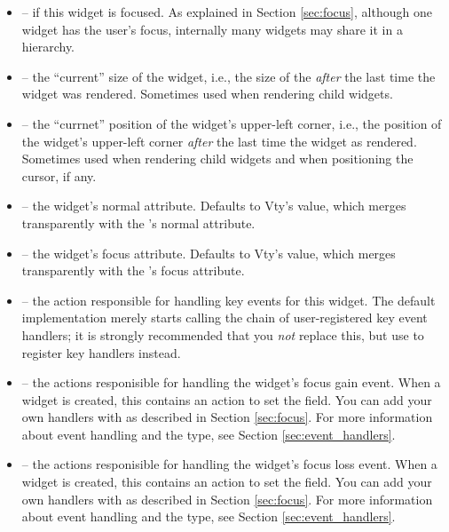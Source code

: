 \begin{itemize}
\item {} --  if this widget is focused.  As
  explained in Section \ref{sec:focus}, although one widget has the
  user's focus, internally many widgets may share it in a hierarchy.
\item {} -- the ``current'' size of the widget, i.e.,
  the size of the  \textit{after} the last time the widget
  was rendered.  Sometimes used when rendering child widgets.
\item {} -- the ``currnet'' position of the widget's
  upper-left corner, i.e., the position of the widget's upper-left
  corner \textit{after} the last time the widget as rendered.
  Sometimes used when rendering child widgets and when positioning the
  cursor, if any.
\item {} -- the widget's normal attribute.  Defaults
  to Vty's  value, which merges transparently with the
  's normal attribute.
\item {} -- the widget's focus attribute.  Defaults
  to Vty's  value, which merges transparently with the
  's focus attribute.
\item {} -- the action responsible for handling key
  events for this widget.  The default implementation merely starts
  calling the chain of user-registered key event handlers; it is
  strongly recommended that you \textit{not} replace this, but use
   to register key handlers instead.
\item {} -- the actions responisible for handling
  the widget's focus gain event.  When a widget is created, this
  contains an action to set the  field.  You can add your
  own handlers with  as described in Section
  \ref{sec:focus}.  For more information about event handling and the
   type, see Section \ref{sec:event_handlers}.
\item {} -- the actions responisible for handling
  the widget's focus loss event.  When a widget is created, this
  contains an action to set the  field.  You can add your
  own handlers with  as described in Section
  \ref{sec:focus}.  For more information about event handling and the
   type, see Section \ref{sec:event_handlers}.
\end{itemize}

